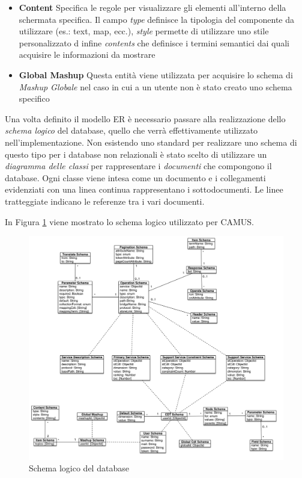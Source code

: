 \begin{itemize}
	\item \textbf{Content}
	Specifica le regole per visualizzare gli elementi all'interno della schermata specifica. Il campo \emph{type} definisce la tipologia del componente da utilizzare (es.: text, map, ecc.), \emph{style} permette di utilizzare uno stile personalizzato d infine \emph{contents} che definisce i termini semantici dai quali acquisire le informazioni da mostrare
	\item \textbf{Global Mashup}
	Questa entità viene utilizzata per acquisire lo schema di \emph{Mashup Globale} nel caso in cui a un utente non è stato creato uno schema specifico
\end{itemize}

Una volta definito il modello ER è necessario passare alla realizzazione dello \emph{schema logico} del database, quello che verrà effettivamente utilizzato nell'implementazione. Non esistendo uno standard per realizzare uno schema di questo tipo per i database non relazionali è stato scelto di utilizzare un \emph{diagramma delle classi} per rappresentare i \emph{documenti} che compongono il database. Ogni classe viene intesa come un documento e i collegamenti evidenziati con una linea continua rappresentano i sottodocumenti. Le linee tratteggiate indicano le referenze tra i vari documenti.

In Figura \ref{fig:schema-logico-db} viene mostrato lo schema logico utilizzato per CAMUS.

\begin{figure}[ht]
	\centering
	\includegraphics[width=\textwidth]{5-implementazione-backend/Immagini/schema_logico_db.png}
	\caption{Schema logico del database}\label{fig:schema-logico-db}
\end{figure}

